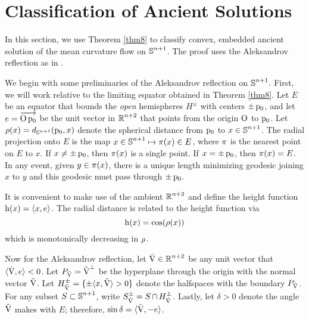 \documentclass{amsart}
\theoremstyle{definition}
\theoremstyle{remark}
\numberwithin{equation}{section}
\begin{document}
\section{Classification of Ancient Solutions}

In this section, we use Theorem \ref{thm8} to classify convex, embedded ancient solution of the mean curvature flow on \(\operatorname{\mathbb{S}}^{n+1}\). The proof uses the Aleksandrov reflection as in \cite{Br-Lou}.

We begin with some preliminaries of the Aleksandrov reflection on \(\operatorname{\mathbb{S}}^{n+1}\). First, we will work relative to the limiting equator obtained in Theorem \ref{thm8}. Let \(E\) be an equator that bounds the \emph{open} hemispheres \(H^{\pm}\) with centers \(\pm \operatorname{p_0}\), and let \(e = \overrightarrow{\operatorname{O}\operatorname{p_0}}\) be the unit vector in \(\operatorname{\mathbb{R}}^{n+2}\) that points from the origin \(\operatorname{O}\) to \(\operatorname{p_0}\). Let \(\operatorname{\rho}(x) = d_{\operatorname{\mathbb{S}}^{n+1}} (\operatorname{p_0}, x)\) denote the spherical distance from \(\operatorname{p_0}\) to \(x \in \operatorname{\mathbb{S}}^{n+1}\). The radial projection onto \(E\) is the map \(x \in \operatorname{\mathbb{S}}^{n+1} \mapsto \operatorname{\pi}(x) \in E\), where \(\operatorname{\pi}\) is the nearest point on \(E\) to \(x\). If \(x \ne \pm \operatorname{p_0}\), then \(\operatorname{\pi}(x)\) is a single point. If \(x = \pm \operatorname{p_0}\), then \(\operatorname{\pi}(x) = E\). In any event, given \(y \in \operatorname{\pi}(x)\), there is a unique length minimizing geodesic joining \(x\) to \(y\) and this geodesic must pass through \(\pm \operatorname{p_0}\).

It is convenient to make use of the ambient \(\operatorname{\mathbb{R}}^{n+2}\) and define the height function \(\operatorname{h}(x) = \langle{x},{e}\rangle\). The radial distance is related to the height function via
\[
\operatorname{h}(x) = \cos(\operatorname{\rho}(x))
\]
which is monotonically decreasing in \(\operatorname{\rho}\).

Now for the Aleksandrov reflection, let \(\operatorname{\vec{V}} \in \operatorname{\mathbb{R}}^{n+2}\) be any unit vector that \(\langle{\operatorname{\vec{V}}},{e}\rangle < 0\). Let \(P_{\operatorname{\vec{V}}} = \operatorname{\vec{V}}^{\perp}\) be the hyperplane through the origin with the normal vector \(\operatorname{\vec{V}}\). Let \({H}_{{\operatorname{\vec{V}}}}^{\pm} = \{\pm \langle{x},{\operatorname{\vec{V}}}\rangle > 0\}\) denote the halfspaces with the boundary \(P_{\operatorname{\vec{V}}}\). For any subset \(S \subset \operatorname{\mathbb{S}}^{n+1}\), write \({S}_{\operatorname{\vec{V}}}^{\pm} = S \operatorname{\cap} {H}_{{\operatorname{\vec{V}}}}^{\pm}\). Lastly, let \(\delta > 0\) denote the angle \(\operatorname{\vec{V}}\) makes with \(E\); therefore, \(\sin \delta = \langle{\operatorname{\vec{V}}},{-e}\rangle\).
\end{document}
